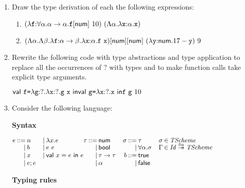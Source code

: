 \begin{enumerate}
\item Draw the type derivation of each the following expressions:
  \begin{enumerate}
    \item
      $(\efunt{\cf}{\tforall{\alpha}{\tarrow{\alpha}{\alpha}}}{
        \etapp{\cf}{\tnum}\ 10})\ (\etfun{\alpha}{\efunt{\cx}{\alpha}{\cx}})$
    \item
      $
        \etapp{\etapp{(\etfun{\alpha}{\etfun{\beta}{
          \efunt{\cf}{\tarrow{\alpha}{\beta}}{
            \efunt{\cx}{\alpha}{\cf\ \cx}
          }
        }})}{\tnum}}{\tnum}\ (\efunt{\cy}{\tnum}{17-\cy})\ 9
      $
  \end{enumerate}

\item Rewrite the following code with type abstractions and type application
to replace all the occurrences of $?$ with types
and to make function calls take explicit type arguments.

$
\ebind{\cf}{\efunt{\code{g}}{?}{\efunt{\cx}{?}{\code{g}\ \cx}}}{\\
\ebind{\code{g}}{\efunt{\cx}{?}{\cx}}{\\
\cf\ \code{g}\ 10}}
$

\item Consider the following language:

\textbf{Syntax}
    \vspace{0.5em}

$
  \small
\begin{array}{@{}r@{\hskip2pt}r@{\hskip2pt}l
  r@{\hskip2pt}l@{\hskip0pt}
  r@{\hskip2pt}r@{\hskip2pt}l@{\hskip10pt}
  r@{\hskip2pt}r@{\hskip2pt}l@{\hskip10pt}
  r@{\hskip2pt}c@{\hskip2pt}l}
  e &::= & n &|& \lambda x.e & \tau &::= & \textsf{num} & \sigma &::=& \tau &
  \sigma&\in&\embox{TScheme}\\[-3pt]
  &|& b &|& e\ e &&|& \tbool &&|& \forall\alpha.\sigma &
  \Gamma&\in&\embox{Id}\finto\embox{TScheme}\\
  &|& x &|& \textsf{val}\ x=e\ \textsf{in}\ e &&|& \tau\rightarrow\tau
  &b&::=&\textsf{true} \\
  &|& e;e &&&&|& \alpha &&|&\textsf{false} \\
\end{array}
$

    \vspace{0.5em}
\textbf{Typing rules}
    \vspace{0.5em}


\end{enumerate}
